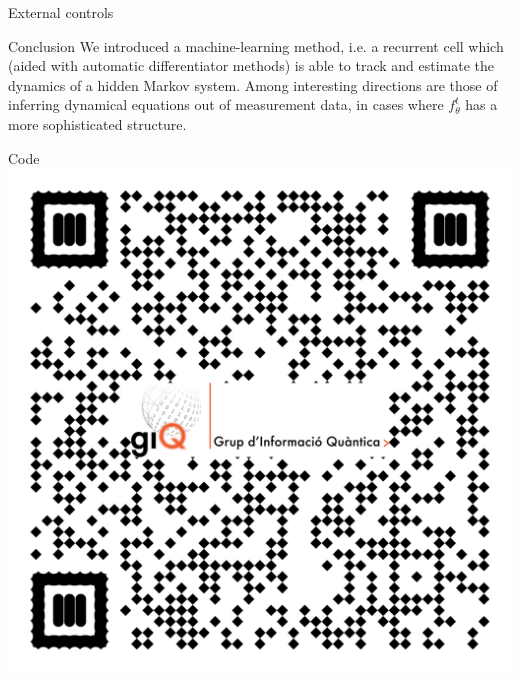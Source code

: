 \documentclass[xcolor={table}]{beamer}
\begin{document}
\begin{frame}[fragile=singleslide,t]
\begin{columns}[onlytextwidth,T]
\begin{column}{.47\textwidth}
\begin{block}{External controls}
{  }
\end{block}


\begin{block}{Conclusion}
  We introduced a machine-learning method, i.e. a recurrent cell which (aided with automatic differentiator methods) is able to track and estimate the dynamics of a hidden Markov system. Among interesting directions are those of inferring dynamical equations out of measurement data, in cases where $f_\theta^t$ has a more sophisticated structure.
  \end{block}


\begin{block}{Code}
\includegraphics[width=.15\textwidth]{figures_poster/qr_repo.pdf}
\end{block}


\printbibliography

\end{column}
\end{columns}


\end{frame}
\end{document}
